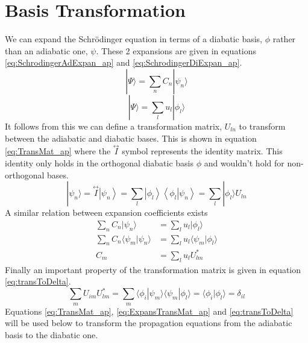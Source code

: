 \chapter{Basis Transformation}
\label{ap:BasisTrans}
We can expand the Schr\"odinger equation in terms of a diabatic basis, $\phi$ rather than an adiabatic one, $\psi$. These 2 expansions are given in equations \eqref{eq:SchrodingerAdExpan_ap} and \eqref{eq:SchrodingerDiExpan_ap}.
\begin{equation}
  |\Psi \rangle = \sum_{n} C_{n} | \psi_n \rangle
  \label{eq:SchrodingerAdExpan_ap}
\end{equation}
\begin{equation}
  |\Psi \rangle = \sum_{l} u_{l} | \phi_l \rangle
  \label{eq:SchrodingerDiExpan_ap}
\end{equation}
It follows from this we can define a transformation matrix, $U_{ln}$ to transform between the adiabatic and diabatic bases. This is shown in equation \eqref{eq:TransMat_ap} where the $\overset{\leftrightarrow}{I}$ symbol represents the identity matrix. This identity only holds in the orthogonal diabatic basis $\phi$ and wouldn't hold for non-orthogonal bases.
\begin{equation}
  | \psi_n \rangle = \overset{\leftrightarrow}{I} \left| \psi_{n} \right\rangle = \sum\limits_{l}\left| \phi_{l} \right\rangle \left\langle \phi_{l} \right| \left. \psi_{n}\right\rangle  = \sum_{l} | \phi_{l} \rangle U_{ln}
  \label{eq:TransMat_ap}
\end{equation}
A similar relation between expansion coefficients exists
\begin{align}
  \sum_{n} C_{n} | \psi_{n} \rangle &= \sum_{l} u_l |\phi_{l} \rangle \\
  \sum_{n} C_{n} \langle \psi_{m} | \psi_{n} \rangle &=  \sum_{l} u_l \langle \psi_{m} |\phi_{l} \rangle \\
  C_{m} &=  \sum_{l} u_l U^{*}_{lm}
  \label{eq:ExpansTransMat_ap}
\end{align}
Finally an important property of the transformation matrix is given in equation \eqref{eq:transToDelta}.
\begin{equation}
  \sum_{m} U_{im} U^{*}_{lm} = \sum_{m} \langle \phi_{i} | \psi_{m} \rangle \langle \psi_{m}| \phi_{l}\rangle = \langle \phi_{i} | \phi_{l} \rangle = \delta_{il}
  \label{eq:transToDelta}
\end{equation}
Equations \eqref{eq:TransMat_ap}, \eqref{eq:ExpansTransMat_ap} and \eqref{eq:transToDelta} will be used below to transform the propagation equations from the adiabatic basis to the diabatic one.


